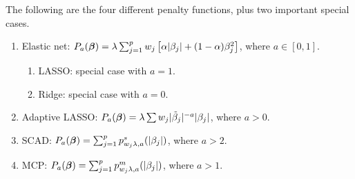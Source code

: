 \documentclass[article]{rqPenVignette}%
\newcommand{\vbeta}{\mbox{\boldmath $\beta$}}
\begin{document}
The following are the four different penalty functions, plus two important special cases. 

\begin{enumerate}
\item Elastic net: $P_a(\vbeta) = \lambda \sum_{j=1}^p w_j \left[ \alpha |\beta_j| +  (1-\alpha) \beta_j^2 \right]$, where $a \in [0,1]$. 
\begin{enumerate}
\item LASSO: special case with $a=1$.
\item Ridge: special case with $a=0$. 
\end{enumerate}
\item Adaptive LASSO: $P_a(\vbeta) = \lambda \sum w_j |\tilde{\beta}_j|^{-a} |\beta_j|$, where $a>0$. 
\item SCAD: $P_a(\vbeta) = \sum_{j=1}^p p^s_{w_j\lambda,a}(|\beta_j|)$, where $a>2$.
\item MCP: $P_a(\vbeta) = \sum_{j=1}^p p^m_{w_j\lambda,a}(|\beta_j|)$, where $a>1$. 
\end{enumerate}
\end{document}
